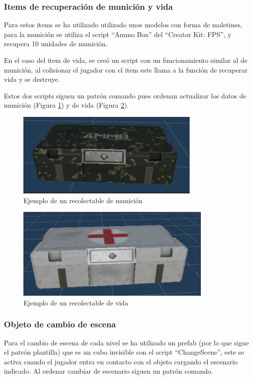 \subsubsection{Items de recuperación de munición y vida}
Para estos items se ha utilizado utilizado unos modelos con forma de maletines, para la munición se utiliza el script ``Ammo Box'' del ``Creator Kit: FPS'', y recupera 10 unidades de munición.

En el caso del item de vida, se creó un script con un funcionamiento similar al de munición, al colisionar el jugador con el item este llama a la función de recuperar vida y se destruye.

Estos dos scripts siguen un patrón comando pues ordenan actualizar los datos de munición (Figura \ref{fig:EjemploMunicion3D}) y de vida (Figura \ref{fig:EjemploVida3D}).

\begin{figure}[H]
	\centering
	\includegraphics[scale=0.65]{imagenes/EjemploMunicion3D.png}
	\caption{\label{fig:EjemploMunicion3D}Ejemplo de un recolectable de munición}
\end{figure}

\begin{figure}[H]
	\centering
	\includegraphics[scale=0.65]{imagenes/EjemploVida3D.png}
	\caption{\label{fig:EjemploVida3D}Ejemplo de un recolectable de vida}
\end{figure}

\subsubsection{Objeto de cambio de escena}
Para el cambio de escena de cada nivel se ha utilizado un prefab (por lo que sigue el patrón plantilla) que es un cubo invisible con el script ``ChangeScene'', este se activa cuando el jugador entra en contacto con el objeto cargando el escenario indicado. Al ordenar cambiar de escenario siguen un patrón comando.

